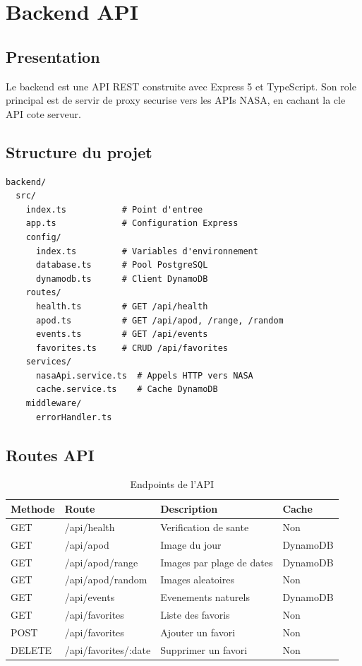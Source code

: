 \chapter{Backend API}

\section{Presentation}

Le backend est une API REST construite avec Express 5 et TypeScript. Son role principal
est de servir de proxy securise vers les APIs NASA, en cachant la cle API cote serveur.

\section{Structure du projet}

\begin{lstlisting}[language={},caption={Arborescence du backend}]
backend/
  src/
    index.ts           # Point d'entree
    app.ts             # Configuration Express
    config/
      index.ts         # Variables d'environnement
      database.ts      # Pool PostgreSQL
      dynamodb.ts      # Client DynamoDB
    routes/
      health.ts        # GET /api/health
      apod.ts          # GET /api/apod, /range, /random
      events.ts        # GET /api/events
      favorites.ts     # CRUD /api/favorites
    services/
      nasaApi.service.ts  # Appels HTTP vers NASA
      cache.service.ts    # Cache DynamoDB
    middleware/
      errorHandler.ts
\end{lstlisting}

\section{Routes API}

\begin{table}[H]
    \centering
    \begin{tabularx}{\textwidth}{llXl}
        \toprule
        \textbf{Methode} & \textbf{Route} & \textbf{Description} & \textbf{Cache} \\
        \midrule
        GET & /api/health & Verification de sante & Non \\
        GET & /api/apod & Image du jour & DynamoDB \\
        GET & /api/apod/range & Images par plage de dates & DynamoDB \\
        GET & /api/apod/random & Images aleatoires & Non \\
        GET & /api/events & Evenements naturels & DynamoDB \\
        GET & /api/favorites & Liste des favoris & Non \\
        POST & /api/favorites & Ajouter un favori & Non \\
        DELETE & /api/favorites/:date & Supprimer un favori & Non \\
        \bottomrule
    \end{tabularx}
    \caption{Endpoints de l'API}
\end{table}

